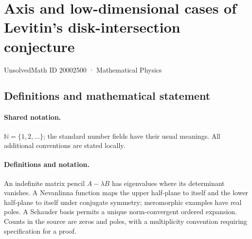 \documentclass[11pt]{article}
\begin{document}
\setcounter{section}{20002499}
\section{Axis and low-dimensional cases of Levitin's disk-intersection conjecture}\label{20002500}
{\small UnsolvedMath ID 20002500 · Mathematical Physics}
\subsection{Definitions and mathematical statement}

\paragraph{Shared notation.}$\mathbb N=\{1,2,\ldots\}$; the standard number fields have their usual meanings. All additional conventions are stated locally.


\paragraph{Definitions and notation.}An indefinite matrix pencil $A-\lambda B$ has eigenvalues where its determinant vanishes. A Nevanlinna function maps the upper half-plane to itself and the lower half-plane to itself under conjugate symmetry; meromorphic examples have real poles. A Schauder basis permits a unique norm-convergent ordered expansion. Counts in the source are zeros and poles, with a multiplicity convention requiring specification for a proof.
\end{document}
